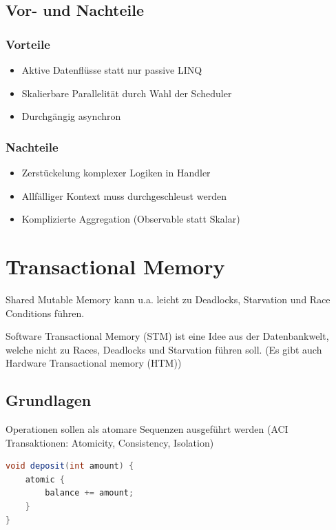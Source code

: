 \subsection{Vor- und Nachteile}

\subsubsection{Vorteile}
\begin{itemize}
	\item Aktive Datenflüsse statt nur passive LINQ
	\item Skalierbare Parallelität durch Wahl der Scheduler
	\item Durchgängig asynchron
\end{itemize}


\subsubsection{Nachteile}
\begin{itemize}
	\item Zerstückelung komplexer Logiken in Handler
	\item Allfälliger Kontext muss durchgeschleust werden
	\item Komplizierte Aggregation (Observable statt Skalar)
\end{itemize}


\section{Transactional Memory}

Shared Mutable Memory kann u.a. leicht zu Deadlocks, Starvation und Race Conditions führen.

Software Transactional Memory (STM) ist eine Idee aus der Datenbankwelt, welche nicht zu Races, Deadlocks und Starvation führen soll. (Es gibt auch Hardware Transactional memory (HTM))


\subsection{Grundlagen}

Operationen sollen als atomare Sequenzen ausgeführt werden (ACI Transaktionen: Atomicity, Consistency, Isolation)

\begin{lstlisting}[language=java]
void deposit(int amount) {
	atomic {
		balance += amount;
	}
}
\end{lstlisting}

